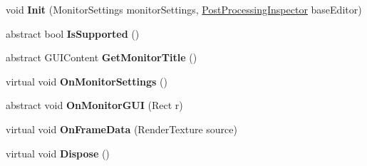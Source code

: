\begin{DoxyCompactItemize}
\item 
\mbox{\label{class_unity_editor_1_1_post_processing_1_1_post_processing_monitor_a7772670b4fd34e76a0cb35d372ed1718}} 
void {\bfseries Init} (Monitor\+Settings monitor\+Settings, \hyperlink{class_unity_editor_1_1_post_processing_1_1_post_processing_inspector}{Post\+Processing\+Inspector} base\+Editor)
\item 
\mbox{\label{class_unity_editor_1_1_post_processing_1_1_post_processing_monitor_ab308a1c99994f4708f5502ddc640dc0a}} 
abstract bool {\bfseries Is\+Supported} ()
\item 
\mbox{\label{class_unity_editor_1_1_post_processing_1_1_post_processing_monitor_a4fb67dcd17b84d422c69f98159e20545}} 
abstract G\+U\+I\+Content {\bfseries Get\+Monitor\+Title} ()
\item 
\mbox{\label{class_unity_editor_1_1_post_processing_1_1_post_processing_monitor_a40e1d68334826b54634a87837cc4ef89}} 
virtual void {\bfseries On\+Monitor\+Settings} ()
\item 
\mbox{\label{class_unity_editor_1_1_post_processing_1_1_post_processing_monitor_a51ecfadbfa10eb105e8c708b4d7064c4}} 
abstract void {\bfseries On\+Monitor\+G\+UI} (Rect r)
\item 
\mbox{\label{class_unity_editor_1_1_post_processing_1_1_post_processing_monitor_a490e202a0b1d45fdbc073d6000a7e220}} 
virtual void {\bfseries On\+Frame\+Data} (Render\+Texture source)
\item 
\mbox{\label{class_unity_editor_1_1_post_processing_1_1_post_processing_monitor_a89c45fe9fe5a185eb55ef522cba5dec5}} 
virtual void {\bfseries Dispose} ()
\end{DoxyCompactItemize}

